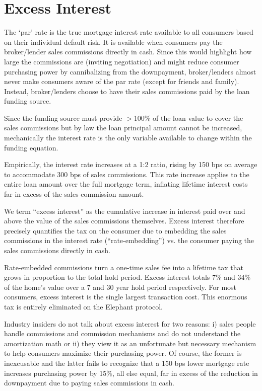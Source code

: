 \appendix
\chapter{Excess Interest}

The `par' rate is the true mortgage interest rate available to all consumers based on their individual default risk. It is available when consumers pay the broker/lender sales commissions directly in cash. Since this would highlight how large the commissions are (inviting negotiation) and might reduce consumer purchasing power by cannibalizing from the downpayment, broker/lenders almost never make consumers aware of the par rate (except for friends and family). Instead, broker/lenders choose to have their sales commissions paid by the loan funding source.

Since the funding source must provide $>$100\% of the loan value to cover the sales commissions but by law the loan principal amount cannot be increased, mechanically the interest rate is the only variable available to change within the funding equation.

Empirically, the interest rate increases at a 1:2 ratio, rising by 150 bps on average to accommodate 300 bps of sales commissions. This rate increase applies to the entire loan amount over the full mortgage term, inflating lifetime interest costs far in excess of the sales commission amount.

We term ``excess interest'' as the cumulative increase in interest paid over and above the value of the sales commissions themselves. Excess interest therefore precisely quantifies the tax on the consumer due to embedding the sales commissions in the interest rate (``rate-embedding'') vs. the consumer paying the sales commissions directly in cash.

Rate-embedded commissions turn a one-time sales fee into a lifetime tax that grows in proportion to the total hold period. Excess interest totals 7\% and 34\% of the home's value over a 7 and 30 year hold period respectively. For most consumers, excess interest is the single largest transaction cost. This enormous tax is entirely eliminated on the Elephant protocol.

Industry insiders do not talk about excess interest for two reasons: i) sales people handle commissions and commission mechanisms and do not understand the amortization math or ii) they view it as an unfortunate but necessary mechanism to help consumers maximize their purchasing power. Of course, the former is inexcusable and the latter fails to recognize that a 150 bps lower mortgage rate increases purchasing power by 15\%, all else equal, far in excess of the reduction in downpayment due to paying sales commissions in cash.